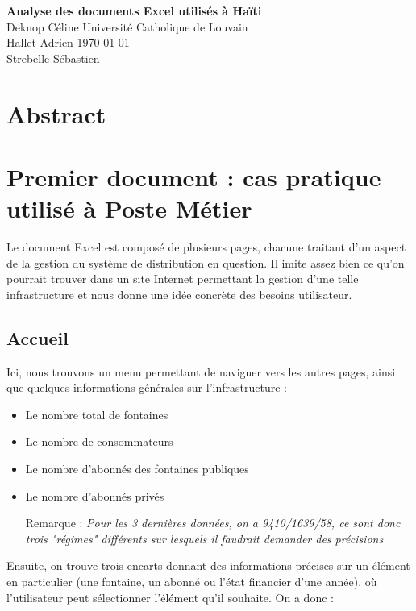 \documentclass[a4paper, 11pt]{article}
\begin{document}
\noindent
\large\textbf{Analyse des documents Excel utilisés à Haïti} \\
\normalsize Deknop Céline \hfill Université Catholique de Louvain \\
Hallet Adrien \hfill \today \\
Strebelle Sébastien

\section*{Abstract}


\section{Premier document : cas pratique utilisé à Poste Métier}
Le document Excel est composé de plusieurs pages, chacune traitant d'un aspect de la gestion du système de distribution en question. Il imite assez bien ce qu'on pourrait trouver dans un site Internet permettant la gestion d'une telle infrastructure et nous donne une idée concrète des besoins utilisateur.

\subsection{Accueil}
Ici, nous trouvons un menu permettant de naviguer vers les autres pages, ainsi que quelques informations générales sur l'infrastructure :

\begin{itemize}
    \item Le nombre total de fontaines
    \item Le nombre de consommateurs
    \item Le nombre d'abonnés des fontaines publiques
    \item Le nombre d'abonnés privés
    \item[Remarque] : \emph{Pour les 3 dernières données, on a 9410/1639/58, ce sont donc trois "régimes" différents sur lesquels il faudrait demander des précisions}
\end{itemize}

Ensuite, on trouve trois encarts donnant des informations précises sur un élément en particulier (une fontaine, un abonné ou l'état financier d'une année), où l'utilisateur peut sélectionner l'élément qu'il souhaite. On a donc :
\end{document}

